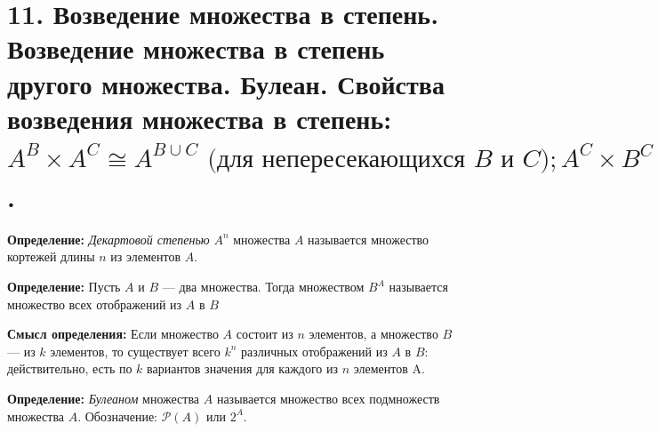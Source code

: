 \section*{11. Возведение множества в степень. Возведение множества в степень другого множества. Булеан. Свойства возведения множества в степень: $A^B \times A^C \cong A^{B \cup C} \mbox{ (для непересекающихся $B$ и $C$)}; A^C \times B^C \cong (A \times B)^C; (A^B)^C \cong A^{B \times C} \mbox{(для произвольных $A$, $B$, $C$)}$.}
\par  \textbf{Определение: }\textit{Декартовой степенью} $A^n$ множества $A$ называется множество кортежей длины $n$ из элементов $A$.
\par \textbf{Определение: }Пусть $A$ и $B$ — два множества. Тогда множеством $B^A$ называется множество всех отображений из $A$ в $B$
\par \textbf{Смысл определения:} Если множество $A$ состоит из $n$ элементов, а множество $B$ — из $k$ элементов, то существует всего $k^n$ различных отображений из $A$ в $B$: действительно, есть по $k$ вариантов значения для каждого из $n$ элементов A.
\par \textbf{Определение: }\textit{Булеаном} множества $A$ называется множество всех подмножеств
множества $A$. Обозначение: $\mathcal{P}(A)$ или $2^A$.
